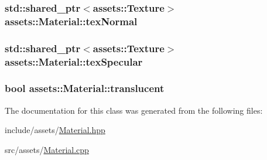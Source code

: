 \hypertarget{classassets_1_1Material_a0e17989592b905f9d12d1353ec34f9e2}{
\subsubsection[{tex\-Normal}]{\setlength{\rightskip}{0pt plus 5cm}std\-::shared\-\_\-ptr$<${\bf assets\-::\-Texture}$>$ assets\-::\-Material\-::tex\-Normal}}\label{classassets_1_1Material_a0e17989592b905f9d12d1353ec34f9e2}
\hypertarget{classassets_1_1Material_ab0357e94a23e480b11ba859a122d5395}{
\subsubsection[{tex\-Specular}]{\setlength{\rightskip}{0pt plus 5cm}std\-::shared\-\_\-ptr$<${\bf assets\-::\-Texture}$>$ assets\-::\-Material\-::tex\-Specular}}\label{classassets_1_1Material_ab0357e94a23e480b11ba859a122d5395}
\hypertarget{classassets_1_1Material_a0319520a8574e4425d3f33545f3fe8cd}{
\subsubsection[{translucent}]{\setlength{\rightskip}{0pt plus 5cm}bool assets\-::\-Material\-::translucent}}\label{classassets_1_1Material_a0319520a8574e4425d3f33545f3fe8cd}


The documentation for this class was generated from the following files\-:\begin{DoxyCompactItemize}
\item 
include/assets/\hyperlink{Material_8hpp}{Material.\-hpp}\item 
src/assets/\hyperlink{Material_8cpp}{Material.\-cpp}\end{DoxyCompactItemize}
